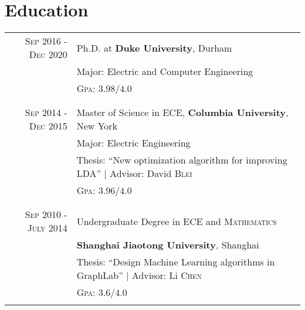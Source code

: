\documentclass[a4paper,10pt]{article}
\begin{document}
\section{Education}
\begin{tabular}{r|p{11cm}}
\textsc{\textsc{Sep} 2016 - \textsc{Dec} 2020} & Ph.D. at \textbf{Duke University}, Durham\\
& Major: Electric and Computer Engineering\\
&\textsc{Gpa}: $3.98/4.0$ \\&\\
\multicolumn{2}{c}{} \\
 \small{\textsc{Sep} 2014 - \textsc{Dec} 2015} & Master of Science in \textsc{ECE}, \textbf{Columbia University}, New York\\
& Major: Electric Engineering\\
& \small Thesis: ``New optimization algorithm for improving LDA'' | \small Advisor: David \textsc{Blei}\\
&\normalsize \textsc{Gpa}: $3.96/4.0$\\&\\
\multicolumn{2}{c}{} \\
\small{\textsc{Sep} 2010 - \textsc{July} 2014}& Undergraduate Degree in \textsc{ECE} and \textsc{Mathematics} \\ &\normalsize\textbf{Shanghai Jiaotong University}, Shanghai\\
& \small Thesis: ``Design Machine Learning algorithms in GraphLab'' | \small Advisor: Li \textsc{Chen}\\
&\normalsize \textsc{Gpa}: $3.6/4.0$\\&\\
\end{tabular}
\vspace{-3mm}
\end{document}
